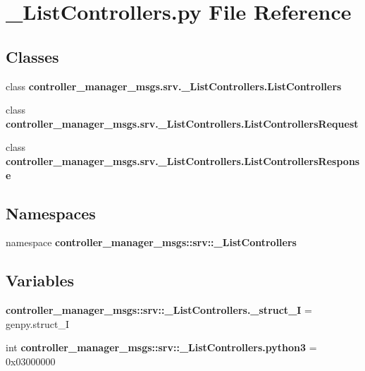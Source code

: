 \section{\-\_\-\-List\-Controllers.\-py \-File \-Reference}
\label{__ListControllers_8py}
\subsection*{\-Classes}
\begin{DoxyCompactItemize}
\item 
class {\bf controller\-\_\-manager\-\_\-msgs.\-srv.\-\_\-\-List\-Controllers.\-List\-Controllers}
\item 
class {\bf controller\-\_\-manager\-\_\-msgs.\-srv.\-\_\-\-List\-Controllers.\-List\-Controllers\-Request}
\item 
class {\bf controller\-\_\-manager\-\_\-msgs.\-srv.\-\_\-\-List\-Controllers.\-List\-Controllers\-Response}
\end{DoxyCompactItemize}
\subsection*{\-Namespaces}
\begin{DoxyCompactItemize}
\item 
namespace {\bf controller\-\_\-manager\-\_\-msgs\-::srv\-::\-\_\-\-List\-Controllers}
\end{DoxyCompactItemize}
\subsection*{\-Variables}
\begin{DoxyCompactItemize}
\item 
{\bf controller\-\_\-manager\-\_\-msgs\-::srv\-::\-\_\-\-List\-Controllers.\-\_\-struct\-\_\-\-I} = genpy.\-struct\-\_\-\-I
\item 
int {\bf controller\-\_\-manager\-\_\-msgs\-::srv\-::\-\_\-\-List\-Controllers.\-python3} = 0x03000000
\end{DoxyCompactItemize}
